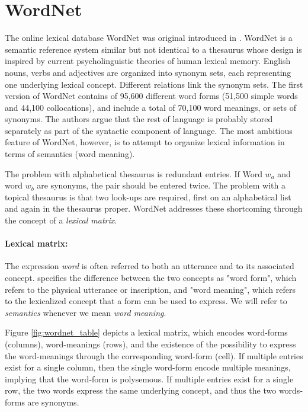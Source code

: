 \documentclass[a4paper,12pt,oneside,openright]{report}
\begin{document}
\section{WordNet}

The online lexical database WordNet was original introduced in \cite{miller90}.
WordNet is a semantic reference system similar but not identical to a thesaurus whose design is inspired by current psycholinguistic theories of human lexical memory.
English nouns, verbs and adjectives are organized into synonym sets, each representing one underlying lexical concept.
Different relations link the synonym sets.
The first version of WordNet contains of 95,600 different word forms (51,500 simple words and 44,100 collocations), and include a total of 70,100 word meanings, or sets of synonyms.
The authors argue that the rest of language is probably stored separately as part of the syntactic component of language.
The most ambitious feature of WordNet, however, is to attempt to organize lexical information in terms of semantics (word meaning).

The problem with alphabetical thesaurus is redundant entries. If Word $w_a$ and word $w_b$ are synonyms, the pair should be entered twice.
The problem with a topical thesaurus is that two look-ups are required, first on an alphabetical list and again in the thesaurus proper.
WordNet addresses these shortcoming through the concept of a \textit{lexical matrix}.

\paragraph{Lexical matrix:} 
The expression \textit{word} is often referred to both an utterance and to its associated concept.
\cite{miller90} specifies the difference between the two concepts as "word form", which refers to the physical utterance or inscription, and "word meaning", which refers to the lexicalized concept that a form can be used to express.
We will refer to \textit{semantics} whenever we mean \textit{word meaning}.

Figure \ref{fig:wordnet_table} depicts a lexical matrix, which encodes word-forms (columns), word-meanings (rows), and the existence of the possibility to express the word-meanings through the corresponding word-form (cell).
If multiple entries exist for a single column, then the single word-form encode multiple meanings, implying that the word-form is polysemous.
If multiple entries exist for a single row, the two words express the same underlying concept, and thus the two words-forms are synonyms.
\end{document}
